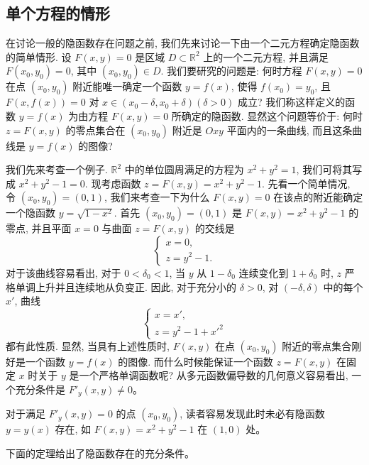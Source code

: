 \documentclass[12pt,fontset=fandol]{ctexart}
\begin{document}
\subsection{单个方程的情形}

在讨论一般的隐函数存在问题之前, 我们先来讨论一下由一个二元方程确定隐函数的简单情形. 设 $F(x,y)=0$ 是区域 $D\subset\mathbb R^2$ 上的一个二元方程, 并且满足 $F(x_0,y_0)=0$, 其中 $(x_0,y_0)\in D$. 我们要研究的问题是: 何时方程 $F(x,y)=0$ 在点 $(x_0,y_0)$ 附近能唯一确定一个函数 $y=f(x)$, 使得 $f(x_0)=y_0$, 且 $F(x,f(x))=0$ 对 $x\in(x_0-\delta,x_0+\delta)(\delta>0)$ 成立? 我们称这样定义的函数 $y=f(x)$ 为由方程 $F(x,y)=0$ 所确定的隐函数. 显然这个问题等价于: 何时 $z=F(x,y)$ 的零点集合在 $(x_0,y_0)$ 附近是 $Oxy$ 平面内的一条曲线, 而且这条曲线是 $y=f(x)$ 的图像?

我们先来考查一个例子. $\mathbb R^2$ 中的单位圆周满足的方程为 $x^2+y^2=1$, 我们可将其写成 $x^2+y^2-1=0$. 现考虑函数 $z=F(x,y)=x^2+y^2-1$. 先看一个简单情况, 令 $(x_0,y_0)=(0,1)$, 我们来考查一下为什么 $F(x,y)=0$ 在该点的附近能确定一个隐函数 $y=\sqrt{1-x^2}$. 首先 $(x_0,y_0)=(0,1)$ 是 $F(x,y)=x^2+y^2-1$ 的零点, 并且平面 $x=0$ 与曲面 $z=F(x,y)$ 的交线是
\[
  \begin{cases}
    x=0,\\
    z=y^2-1.
  \end{cases}
\]
对于该曲线容易看出, 对于 $0<\delta_0<1$, 当 $y$ 从 $1-\delta_0$ 连续变化到 $1+\delta_0$ 时, $z$ 严格单调上升并且连续地从负变正. 因此, 对于充分小的 $\delta>0$, 对 $(-\delta,\delta)$ 中的每个 $x'$, 曲线
\[
  \begin{cases}
    x=x',\\
    z=y^2-1+x'^2
  \end{cases}
\]
都有此性质. 显然, 当具有上述性质时, $F(x,y)$ 在点 $(x_0,y_0)$ 附近的零点集合刚好是一个函数 $y=f(x)$ 的图像. 而什么时候能保证一个函数 $z=F(x,y)$ 在固定 $x$ 时关于 $y$ 是一个严格单调函数呢? 从多元函数偏导数的几何意义容易看出, 一个充分条件是 $F'_y(x,y)\ne0$。

对于满足 $F'_y(x,y)=0$ 的点 $(x_0,y_0)$, 读者容易发现此时未必有隐函数 $y=y(x)$ 存在, 如 $F(x,y)=x^2+y^2-1$ 在 $(1,0)$ 处。

下面的定理给出了隐函数存在的充分条件。
\end{document}
